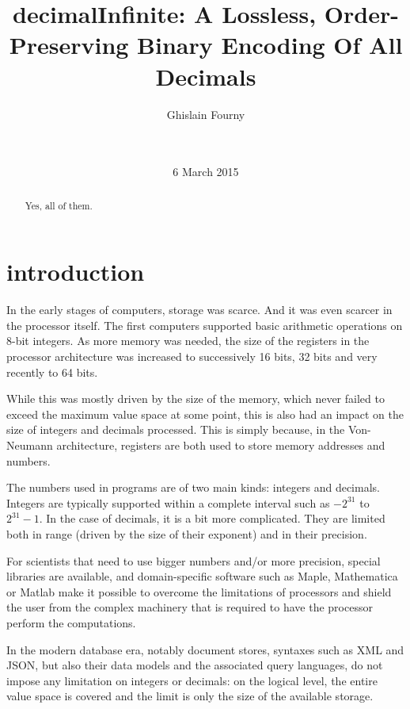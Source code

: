 \documentclass{acm_proc_article-sp}
\begin{document}
\title{decimalInfinite: A Lossless, Order-Preserving Binary Encoding Of All Decimals}


\author{
\alignauthor
Ghislain Fourny\\
       \\
       \\
}
\date{6 March 2015}
\maketitle

\begin{abstract}
Yes, all of them.
\end{abstract}

\section{introduction}
In the early stages of computers, storage was scarce. And it was even scarcer in the processor itself. The first computers supported basic arithmetic operations on 8-bit integers. As more memory was needed, the size of the registers in the processor architecture was increased to successively 16 bits, 32 bits and very recently to 64 bits.

While this was mostly driven by the size of the memory, which never failed to exceed the maximum value space at some point, this is also had an impact on the size of integers and decimals processed. This is simply because, in the Von-Neumann architecture, registers are both used to store memory addresses and numbers.

The numbers used in programs are of two main kinds: integers and decimals. Integers are typically supported within a complete interval such as $- 2^{31}$ to $2^{31} -1$. In the case of decimals, it is a bit more complicated. They are limited both in range (driven by the size of their exponent) and in their precision.

For scientists that need to use bigger numbers and/or more precision, special libraries are available, and domain-specific software such as Maple, Mathematica or Matlab make it possible to overcome the limitations of processors and shield the user from the complex machinery that is required to have the processor perform the computations.

In the modern database era, notably document stores, syntaxes such as XML and JSON, but also their data models and the associated query languages, do not impose any limitation on integers or decimals: on the logical level, the entire value space is covered and the limit is only the size of the available storage.
\end{document}
